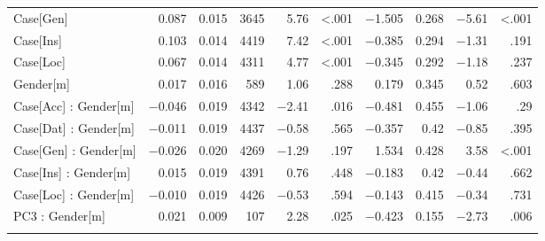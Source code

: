 \documentclass[output=paper, modfonts,newtxmath,hidelinks]{langscibook}
\begin{document}
\begin{sidewaystable}
\begin{tabular}{l*{9}r}
	Case[Gen]	&	0.087	&	0.015	&	3645	&	5.76	&	<.001	&	
					$-$1.505	&	0.268	&	$-$5.61	&	<.001\\
    Case[Ins]	&	0.103	&	0.014	&	4419	&	7.42	&	<.001	&	
					$-$0.385	&	0.294	&	$-$1.31	&	.191\\
	Case[Loc]	&	0.067	&	0.014	&	4311	&	4.77	&	<.001	&	
					$-$0.345	&	0.292	&	$-$1.18	&	.237\\
	Gender[m]	&	0.017	&	0.016	&	589		&	1.06	&	.288	&	
					0.179	&	0.345	&	0.52	&	.603\\
	Case[Acc] : Gender[m]	& $-$0.046	&	0.019	&	4342	&	$-$2.41	&	.016	&	$-$0.481	&	0.455	&	$-$1.06	&	.29\\
	Case[Dat] : Gender[m]	& $-$0.011	&	0.019	&	4437	&	$-$0.58	&	.565	&	$-$0.357	&	0.42	&	$-$0.85	&	.395\\
	Case[Gen] : Gender[m]	& $-$0.026	&	0.020	&	4269	&	$-$1.29	&	.197	&	1.534	&	0.428	&	3.58	&	<.001\\
	Case[Ins] : Gender[m] &	0.015	&	0.019	&	4391	&	0.76	&	.448	&	$-$0.183	&	0.42	&	$-$0.44	&	.662\\
	Case[Loc] : Gender[m]	& $-$0.010	&	0.019	&	4426	&	$-$0.53	&	.594	&	$-$0.143	&	0.415	&	$-$0.34	&	.731\\
	PC3 : Gender[m]			& 0.021	&	0.009	&	107		&	2.28	&	.025	&
							 $-$0.423	&	0.155	&	$-$2.73	&	.006\\
   \lspbottomrule
	\end{tabular}    
\end{sidewaystable}
\end{document}
